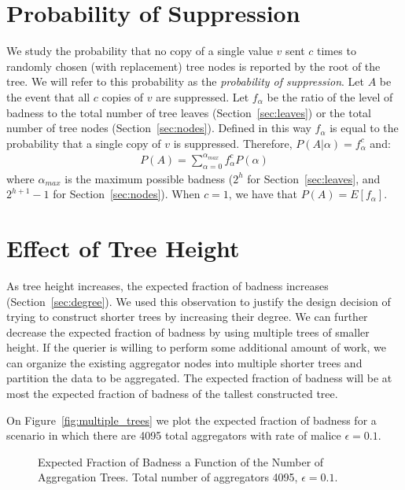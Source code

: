 \documentclass[10pt,twocolumn]{style}
\begin{document}
  \section{Probability of Suppression}
  \label{sec:supress}
  We study the probability that no copy of a single value $v$ sent $c$ times to
  randomly chosen (with replacement) tree nodes is reported by the
  root of the tree. We will refer to this probability as the
  \emph{probability of suppression}. Let $A$ be the event that all $c$
  copies of $v$ are suppressed. Let $f_\alpha$ be the ratio of the
  level of badness to the total number of tree leaves
  (Section~\ref{sec:leaves}) or the total number of tree nodes
  (Section~\ref{sec:nodes}). Defined in this way $f_\alpha$ is equal
  to the probability that a single copy of $v$ is
  suppressed. Therefore, $P(A|\alpha)=f_{\alpha}^c$ and:
  \begin{eqnarray}
    P(A) = \sum_{\alpha=0}^{\alpha_{max}}f_{\alpha}^cP(\alpha)
  \end{eqnarray}
  where $\alpha_{max}$ is the maximum possible badness ($2^h$ for
  Section~\ref{sec:leaves}, and $2^{h+1}-1$ for Section~\ref{sec:nodes}).
  When $c=1$, we have that $P(A)=E[f_{\alpha}]$.

  \section{Effect of Tree Height}
  \label{sec:height}
  As tree height increases, the expected fraction of badness
  increases (Section~\ref{sec:degree}). We used this observation to
  justify the design decision of trying to construct shorter trees by
  increasing their degree. We can further decrease the expected
  fraction of badness by using multiple trees of smaller height. If
  the querier is willing to perform some additional amount of work, we
  can organize the existing aggregator nodes into multiple shorter
  trees and partition the data to be aggregated. The expected fraction
  of badness will be at most the expected fraction of badness of the
  tallest constructed tree.

  On Figure~\ref{fig:multiple_trees} we plot the expected fraction of
  badness for a scenario in which there are 4095 total aggregators
  with rate of malice $\epsilon=0.1$. 

  \begin{figure}[htpb!]
    \begin{center}
      \caption{\label{sec:multiple_trees} Expected Fraction of Badness
      a Function of the Number of Aggregation Trees. Total number of
      aggregators 4095, $\epsilon=0.1$.}
    \end{center}
  \end{figure}
\end{document}
